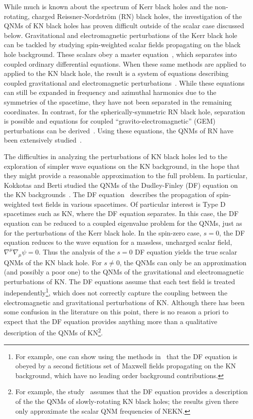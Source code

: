 \begin{refsection}
While much is known about the spectrum of Kerr black holes and the non-rotating, charged Reissner-Nordstr{\"o}m (RN) black holes, the investigation of the QNMs of KN black holes has proven difficult outside of the scalar case discussed below.
Gravitational and electromagnetic perturbations of the Kerr black hole can be tackled by studying spin-weighted scalar fields propagating on the black hole background.
These scalars obey a master equation~\cite{Teukolsky1973}, which separates into coupled ordinary differential equations.
When these same methods are applied to applied to the KN black hole, the result is a system of equations describing coupled gravitational and electromagnetic perturbations~\cite{ChandraBook,Dias:2015wqa}. While these equations can still be expanded in frequency and azimuthal harmonics due to the symmetries of the spacetime, they have not been separated in the remaining coordinates. 
In contrast, for the spherically-symmetric RN black hole, separation is possible and equations for coupled ``gravito-electromagnetic'' (GEM) perturbations can be derived~\cite{Moncrief:1974ng, Moncrief:1974gw, Zerilli:1974ai}. Using these equations, the QNMs of RN have been extensively studied~\cite{Berti2009}.

The difficulties in analyzing the perturbations of KN black holes led to the exploration of simpler wave equations on the KN background, in the hope that they might provide a reasonable approximation to the full problem. 
In particular, Kokkotas and Berti studied the QNMs of the Dudley-Finley (DF) equation on the KN backgrounds~\cite{Kokkotas:1993ef,Berti:2005eb}. 
The DF equation~\cite{Dudley:1977zz,Dudley:1978vd} describes the propagation of spin-weighted test fields in various spacetimes. 
Of particular interest is Type D spacetimes such as KN, where the DF equation separates. 
In this case, the DF equation can be reduced to a coupled eigenvalue problem for the QNMs, just as for the perturbations of the Kerr black hole.
In the spin-zero case, $s=0$, the DF equation reduces to the wave equation for a massless, uncharged scalar field, $\nabla^\mu \nabla_\mu \psi = 0$. Thus the analysis of the $s = 0$ DF equation yields the true scalar QNMs of the KN black hole. 
For $s\neq 0$, the QNMs can only be an approximation (and possibly a poor one) to the QNMs of the gravitational and electromagnetic perturbations of KN.
The DF equations assume that each test field is treated independently\footnote{For example, one can show using the methods in~\cite{Teukolsky1973} that the DF equation is obeyed by a second fictitious set of Maxwell fields propagating on the KN background, which have no leading order background contributions.}, which does not correctly capture the coupling between the electromagnetic and gravitational perturbations of KN.
Although there has been some confusion in the literature on this point, there is no reason a priori to expect that the DF equation provides anything more than a qualitative description of the QNMs of 
KN\footnote{For example, the study~\cite{Hod:2008se} assumes that the DF equation provides a description of the the QNMs of slowly-rotating KN black holes; the results given there only approximate the scalar QNM frequencies of NEKN.}. 


\end{refsection}
